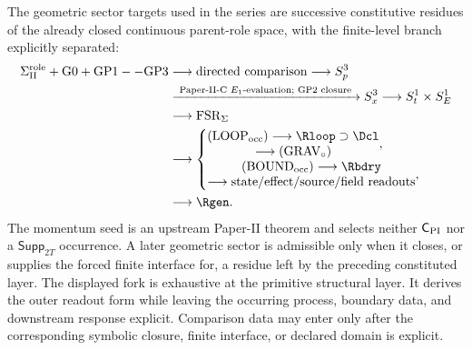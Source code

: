\documentclass[11pt,a4paper]{article}
\begin{document}
\begin{corollary}
\label{p3:cor:forced-sector-succession}
The geometric sector targets used in the series are successive constitutive
residues of the already closed continuous parent-role space, with the finite-level
branch explicitly separated:
\[
\begin{aligned}
\Sigma_{\rm II}^{\rm role}+\mathrm{G0}+\mathrm{GP1--GP3}
&\longrightarrow\text{directed comparison}\longrightarrow S^3_p\\
&\xrightarrow{\ \text{Paper-II-C }E_1\text{-evaluation; GP2 closure}\ }
S^3_x\longrightarrow S^1_t\times S^1_E\\
&\longrightarrow\operatorname{FSR}_{\Sigma}\\
&\longrightarrow
\begin{cases}
\begin{gathered}(\mathrm{LOOP}_{\rm occ})\longrightarrow\Rloop\supset\Dcl\\
\longrightarrow(\mathrm{GRAV}_{\circ})\end{gathered},\\[3pt]
\begin{gathered}(\mathrm{BOUND}_{\rm occ})\longrightarrow\Rbdry\\
\longrightarrow\text{state/effect/source/field readouts}\end{gathered},
\end{cases}\\
&\longrightarrow\Rgen.
\end{aligned}
\]
The momentum seed is an upstream Paper-II theorem and selects neither
\(\mathsf C_{\rm PI}\) nor a \(\mathsf{Supp}_{2T}\) occurrence.
A later geometric sector is admissible only when it closes, or supplies the
forced finite interface for, a residue left by the preceding constituted
layer.  The displayed fork is exhaustive at the primitive structural layer.
It derives the outer readout form while leaving the occurring process,
boundary data, and downstream response explicit.  Comparison data may enter only
after the corresponding symbolic closure, finite interface, or declared
domain is explicit.
\end{corollary}
\end{document}
